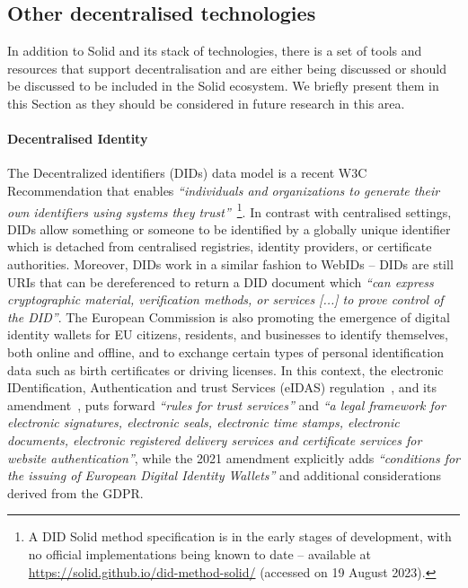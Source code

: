 
\subsection{Other decentralised technologies}
\label{sec:sota_other_technologies}

In addition to Solid and its stack of technologies, there is a set of tools and resources that support decentralisation and are either being discussed or should be discussed to be included in the Solid ecosystem.
We briefly present them in this Section as they should be considered in future research in this area.

\paragraph{Decentralised Identity}
The Decentralized identifiers (DIDs) data model is a recent W3C Recommendation that enables \textit{``individuals and organizations to generate their own identifiers using systems they trust''}~\citep{sporny_decentralized_2022}\footnote{A DID Solid method specification is in the early stages of development, with no official implementations being known to date -- available at \url{https://solid.github.io/did-method-solid/} (accessed on 19 August 2023).}.
In contrast with centralised settings, DIDs allow something or someone to be identified by a globally unique identifier which is detached from centralised registries, identity providers, or certificate authorities.
Moreover, DIDs work in a similar fashion to WebIDs -- DIDs are still URIs that can be dereferenced to return a DID document which \textit{``can express cryptographic material, verification methods, or services [...] to prove control of the DID''}.
The European Commission is also promoting the emergence of digital identity wallets for EU citizens, residents, and businesses to identify themselves, both online and offline, and to exchange certain types of personal identification data such as birth certificates or driving licenses.
In this context, the electronic IDentification, Authentication and trust Services (eIDAS) regulation~\citeyearpar{noauthor_regulation_2014}, and its amendment~\citeyearpar{noauthor_eidas2_2021}, puts forward \textit{``rules for trust services''} and \textit{``a legal framework for electronic signatures, electronic seals, electronic time stamps, electronic documents, electronic registered delivery services and certificate services for website authentication''}, while the 2021 amendment explicitly adds \textit{``conditions for the issuing of European Digital Identity Wallets''} and additional considerations derived from the GDPR.

